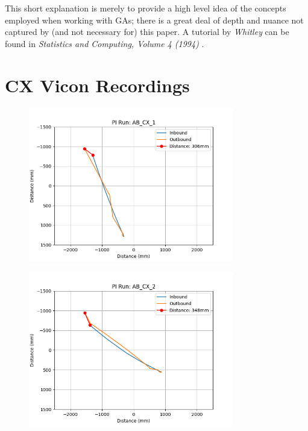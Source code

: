 \documentclass[a4paper,11pt,twoside,openright]{article}
\let\oldsection\section
\def\section{\cleardoublepage\oldsection}
\begin{document}
This short explanation is merely to provide a high level idea of the concepts
employed when working with GAs; there is a great deal of depth and nuance
not captured by (and not necessary for) this paper. A tutorial by
\textit{Whitley} can be found in \textit{Statistics and Computing, Volume 4
  (1994)} \cite{Whitley1994}. 

\section{CX Vicon Recordings}\label{ap:cxfigs}
\begin{figure}[h!]
  \centering
  \includegraphics[width=0.8\textwidth]{AB_CX_1}
  \caption{\label{fig:abcx1}}
\end{figure}

\begin{figure}[h!]
  \centering
  \includegraphics[width=0.8\textwidth]{AB_CX_2}
  \caption{\label{fig:abcx2}}
\end{figure}
\end{document}
